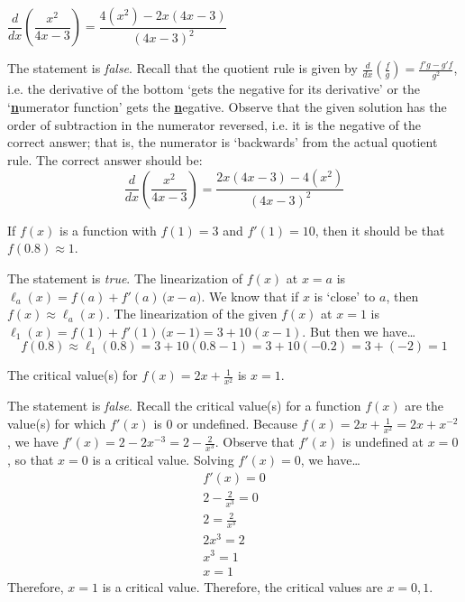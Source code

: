 \documentclass[11pt,letterpaper]{article}
\begin{document}
 $\dfrac{d}{dx} \left( \dfrac{x^2}{4x - 3} \right)= \dfrac{4(x^2) - 2x(4x - 3)}{(4x - 3)^2}$ \pspace

\sol The statement is \textit{false}. Recall that the quotient rule is given by $\frac{d}{dx} \left( \frac{f}{g} \right)= \frac{f' g - g' f}{g^2}$, i.e. the derivative of the bottom `gets the negative for its derivative' or the `\textbf{\underline{n}}umerator function' gets the \textbf{\underline{n}}egative. Observe that the given solution has the order of subtraction in the numerator reversed, i.e. it is the negative of the correct answer; that is, the numerator is `backwards' from the actual quotient rule. The correct answer should be:
	\[
	\dfrac{d}{dx} \left( \dfrac{x^2}{4x - 3} \right)= \dfrac{2x(4x - 3) - 4(x^2)}{(4x - 3)^2}
	\] \pvspace{1.3cm}



 If $f(x)$ is a function with $f(1)= 3$ and $f'(1)= 10$, then it should be that $f(0.8) \approx 1$. \pspace

\sol The statement is \textit{true}. The linearization of $f(x)$ at $x= a$ is $\ell_a(x)= f(a) + f'(a) \,\big( x - a \big)$. We know that if $x$ is `close' to $a$, then $f(x) \approx \ell_a(x)$. The linearization of the given $f(x)$ at $x= 1$ is $\ell_1(x)= f(1) + f'(1) \,\big( x - 1 \big)= 3 + 10(x - 1)$. But then we have\dots
	\[
	f(0.8) \approx \ell_1(0.8)= 3 + 10(0.8 - 1)= 3 + 10(-0.2)= 3 + (-2)= 1
	\] \pvspace{1.3cm}



 The critical value(s) for $f(x)= 2x + \frac{1}{x^2}$ is $x= 1$. \pspace

\sol The statement is \textit{false}. Recall the critical value(s) for a function $f(x)$ are the value(s) for which $f'(x)$ is 0 or undefined. Because $f(x)= 2x + \frac{1}{x^2}= 2x + x^{-2}$, we have $f'(x)= 2 - 2x^{-3}= 2 - \frac{2}{x^3}$. Observe that $f'(x)$ is undefined at $x= 0$, so that $x= 0$ is a critical value. Solving $f'(x)= 0$, we have\dots
	\[
	\begin{gathered}
	f'(x)= 0 \\
	2 - \frac{2}{x^3}= 0 \\
	2= \frac{2}{x^3} \\
	2x^3= 2 \\
	x^3= 1 \\
	x= 1
	\end{gathered}
	\]
Therefore, $x= 1$ is a critical value. Therefore, the critical values are $x= 0, 1$. \pvspace{1.3cm}
\end{document}
